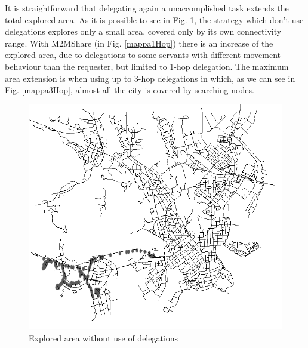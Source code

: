 It is straightforward that delegating again a unaccomplished task extends the total explored area. As it is possible to see in Fig. \ref{mappa0Hop}, the strategy which don't use delegations explores only a small area, covered only by its own connectivity range. With M2MShare (in Fig. \ref{mappa1Hop}) there is an increase of the explored area, due to delegations to some servants with different movement behaviour than the requester, but limited to 1-hop delegation. The maximum area extension is when using up to 3-hop delegations in which, as we can see in Fig. \ref{mappa3Hop}, almost all the city is covered by searching nodes.

\begin{figure}[htpb]
  \begin{center}
    \includegraphics[scale=0.35]{figure/mappa_0_hop.png}
    \caption{Explored area without use of delegations}
    \label{mappa0Hop}
  \end{center}
\end{figure}

